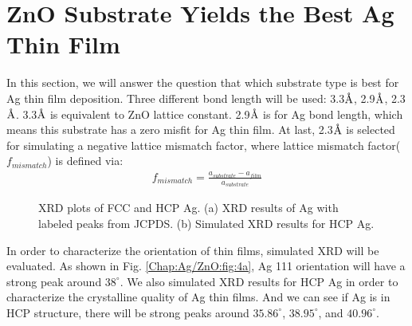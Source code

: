 \section{ZnO Substrate Yields the Best Ag Thin Film}

In this section, we will answer the question that  which substrate type is best for Ag thin film deposition. Three different bond length will be used: 3.3$\mbox{\normalfont\AA}$, 2.9$\mbox{\normalfont\AA}$, 2.3$\mbox{\normalfont\AA}$. 3.3$\mbox{\normalfont\AA}$ is equivalent to ZnO lattice constant. 2.9$\mbox{\normalfont\AA}$ is for Ag bond length, which means this substrate has a zero misfit for Ag thin film. At last, 2.3$\mbox{\normalfont\AA}$ is selected for simulating a negative lattice mismatch factor, where lattice mismatch factor($f_{mismatch}$) is defined via:
\begin{align}
    f_{mismatch} = \frac{a_{substrate} - a_{film}}{a_{substrate}}
    \label{Chap:Ag/ZnO:eq:mismatch}
\end{align}

\begingroup
\begin{figure}[!ht]
  \centering
  \label{Chap:Ag/ZnO:fig:4a}
  \label{Chap:Ag/ZnO:fig:4b}
\caption[XRD plots of FCC and HCP Ag]{XRD plots of FCC and HCP Ag. (a) XRD results of Ag with labeled peaks from JCPDS. \cite{AgPDF} (b) Simulated XRD results for HCP Ag.}
  \label{Chap:Ag/ZnO:fig4}
\end{figure}
\endgroup

In order to characterize the orientation of thin films, simulated \ac{XRD} will be evaluated. As shown in Fig. \ref{Chap:Ag/ZnO:fig:4a}, Ag {111} orientation will have a strong peak around $38^{\circ}$. We also simulated \ac{XRD} results for \ac{HCP} Ag in order to characterize the crystalline quality of Ag thin films. And we can see if Ag is in \ac{HCP} structure, there will be strong peaks around $35.86^{\circ}$, $38.95^{\circ}$, and $40.96^{\circ}$.


